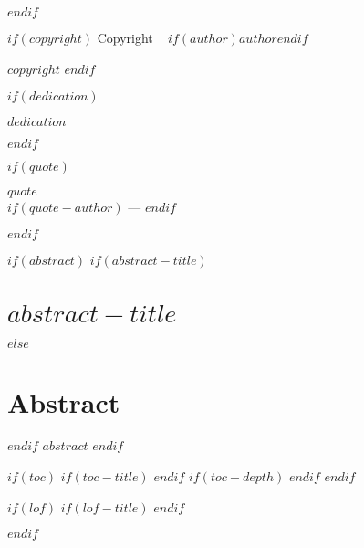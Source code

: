 \documentclass[
$if(fontsize)$
  $fontsize$,
$endif$
$if(lang)$
  $babel-lang$,
$endif$
$if(papersize)$
  $papersize$paper,
$endif$
$if(twoside)$
twoside,
$endif$
$if(openright)$
openright,
$endif$
$if(title)$
titlepage,
$endif$
numbers=noenddot,
headinclude,
footinclude,
cleardoublepage=empty,
abstract=on,
BCOR=5mm,
dvipsnames,
$for(classoption)$
  $classoption$$sep$,
$endfor$
]{scrreport}
\begin{document}
\begin{titlepage}
\end{titlepage}
$endif$

$if(copyright)$
\clearpage
\thispagestyle{empty}
\hfill
\vfill
\noindent Copyright
\textcopyright\ \the\year{} $if(author)$$author$$endif$

\bigskip
\noindent $copyright$
$endif$

$if(dedication)$
\cleardoublepage
\thispagestyle{empty}
\vspace*{3cm}
\begin{flushright}
\textit{$dedication$}
\end{flushright}
$endif$

$if(quote)$
\cleardoublepage
\thispagestyle{empty}
\vspace*{3cm}
\begin{flushright}
\textit{$quote$}\\ \medskip
$if(quote-author)$        
--- 
$endif$
\end{flushright}
$endif$

$if(abstract)$
$if(abstract-title)$
\chapter*{$abstract-title$}
$else$
\chapter*{Abstract}
$endif$
$abstract$
$endif$

$if(toc)$
$if(toc-title)$
\renewcommand*\contentsname{$toc-title$}
$endif$
$if(toc-depth)$
\setcounter{tocdepth}{$toc-depth$}
$endif$
\tableofcontents
$endif$

$if(lof)$
$if(lof-title)$
\renewcommand*\listfigurename{$lof-title$}
$endif$
\listoffigures
$endif$
\end{document}
